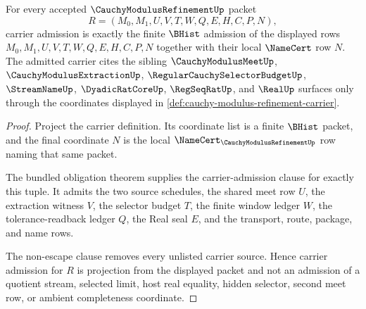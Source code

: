 \begin{theorem}
\label{thm:cauchy-modulus-refinement-carrier-admission}
For every accepted $\CauchyModulusRefinementUp$ packet
$$
R=(M_0,M_1,U,V,T,W,Q,E,H,C,P,N),
$$
carrier admission is exactly the finite $\BHist$ admission of the displayed rows $M_0,M_1,U,V,T,W,Q,E,H,C,P,N$ together with their local $\NameCert$ row $N$. The admitted carrier cites the sibling $\CauchyModulusMeetUp$, $\CauchyModulusExtractionUp$, $\RegularCauchySelectorBudgetUp$, $\StreamNameUp$, $\DyadicRatCoreUp$, $\RegSeqRatUp$, and $\RealUp$ surfaces only through the coordinates displayed in \autoref{def:cauchy-modulus-refinement-carrier}.
\end{theorem}
\begin{proof}
Project the carrier definition. Its coordinate list is a finite $\BHist$ packet, and the final coordinate $N$ is the local $\NameCert_{\CauchyModulusRefinementUp}$ row naming that same packet.

The bundled obligation theorem supplies the carrier-admission clause for exactly this tuple. It admits the two source schedules, the shared meet row $U$, the extraction witness $V$, the selector budget $T$, the finite window ledger $W$, the tolerance-readback ledger $Q$, the Real seal $E$, and the transport, route, package, and name rows.

The non-escape clause removes every unlisted carrier source. Hence carrier admission for $R$ is projection from the displayed packet and not an admission of a quotient stream, selected limit, host real equality, hidden selector, second meet row, or ambient completeness coordinate.
\end{proof}

